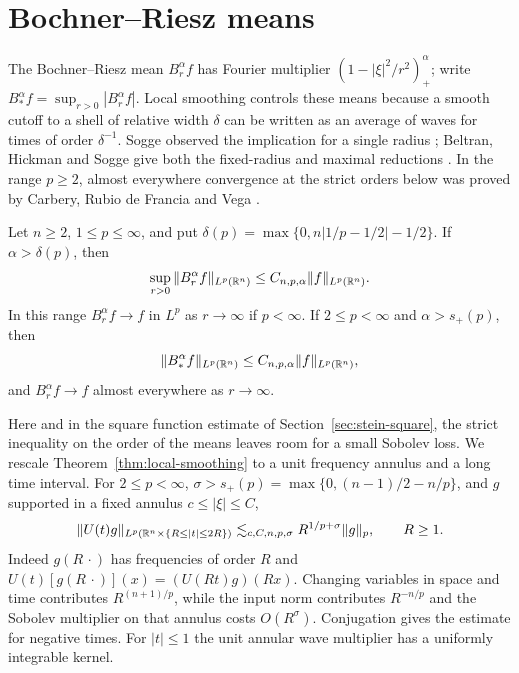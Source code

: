 \section{Bochner--Riesz means}
\label{sec:consequences}

The Bochner--Riesz mean \(B_r^\alpha f\) has Fourier multiplier
\((1-|\xi|^2/r^2)_+^\alpha\); write
\(B_*^\alpha f=\sup_{r>0}|B_r^\alpha f|\). Local smoothing controls these
means because a smooth cutoff to a shell of relative width \(\delta\)
can be written as an average of waves for times of order \(\delta^{-1}\).
Sogge observed the implication for a single radius
\cite[Equations~(4.5)--(4.6)]{Sogge1991};
Beltran, Hickman and Sogge give both the fixed-radius and maximal
reductions \cite[Propositions~39 and~40]{BHS2021}. In the range
\(p\ge2\), almost everywhere convergence at the strict orders below was
proved by Carbery, Rubio de Francia and Vega \cite{CRV1988Summability}.

\begin{theorem}\label{thm:bochner-riesz}
Let \(n\ge2\), \(1\le p\le\infty\), and put
\(\delta(p)=\max\{0,n|1/p-1/2|-1/2\}\).
If \(\alpha>\delta(p)\), then
\begin{equation}\label{eq:br-uniform}
 \sup_{r>0}\|B_r^\alpha f\|_{L^p(\mathbb R^n)}
       \le C_{n,p,\alpha}\|f\|_{L^p(\mathbb R^n)}.
\end{equation}
In this range \(B_r^\alpha f\to f\) in \(L^p\) as \(r\to\infty\) if
\(p<\infty\). If \(2\le p<\infty\) and \(\alpha>s_+(p)\), then
\begin{equation}\label{eq:br-maximal}
 \|B_*^\alpha f\|_{L^p(\mathbb R^n)}\le C_{n,p,\alpha}\|f\|_{L^p(\mathbb R^n)},
\end{equation}
and \(B_r^\alpha f\to f\) almost everywhere as \(r\to\infty\).
\end{theorem}

Here and in the square function estimate of Section~\ref{sec:stein-square},
the strict inequality on the order of the means leaves room for a small
Sobolev loss. We rescale Theorem~\ref{thm:local-smoothing} to a unit
frequency annulus and a long time interval.
For \(2\le p<\infty\), \(\sigma>s_+(p)=\max\{0,(n-1)/2-n/p\}\),
and \(\widehat g\) supported in a fixed annulus \(c\le|\xi|\le C\),
\begin{equation}\label{eq:cs-unit-wave}
 \|U(t)g\|_{L^p(\mathbb R^n\times\{R\le|t|\le2R\})}
       \lesssim_{c,C,n,p,\sigma} R^{1/p+\sigma}\|g\|_p,\qquad R\ge1.
\end{equation}
Indeed \(g(R\,\cdot)\) has frequencies of order \(R\) and
\(U(t)[g(R\,\cdot)](x)=(U(Rt)g)(Rx)\). Changing variables in space
and time contributes \(R^{(n+1)/p}\), while the input norm contributes
\(R^{-n/p}\) and the Sobolev multiplier on that annulus costs \(O(R^\sigma)\).
Conjugation gives the estimate for negative times. For \(|t|\le1\) the
unit annular wave multiplier has a uniformly integrable kernel.


